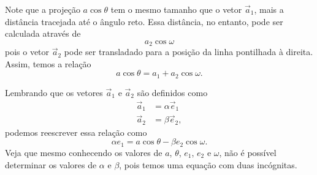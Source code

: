 Note que a projeção $a\cos\theta$ tem o mesmo tamanho que o vetor $\vec{a}_1$, mais a distância tracejada até o ângulo reto. Essa distância, no entanto, pode ser calculada através de 
\begin{displaymath}
    a_2\cos\omega
\end{displaymath}
%
pois o vetor $\vec{a}_2$ pode ser transladado para a posição da linha pontilhada à direita. Assim, temos a relação
\begin{equation}
    a\cos\theta = a_1 + a_2\cos\omega.
\end{equation}

Lembrando que os vetores $\vec{a}_1$ e $\vec{a}_2$ são definidos como
\begin{align*}
    \vec{a}_1 &= \alpha \vec{e}_1 \\
    \vec{a}_2 &= \beta \vec{e}_2,
\end{align*}
%
podemos reescrever essa relação como
\begin{equation}
    \alpha e_1 = a\cos\theta - \beta e_2 \cos\omega.
\end{equation}
%
Veja que mesmo conhecendo os valores de $a$, $\theta$, $e_1$, $e_2$ e $\omega$, não é possível determinar os valores de $\alpha$ e $\beta$, pois temos uma equação com duas incógnitas.

\pagebreak

